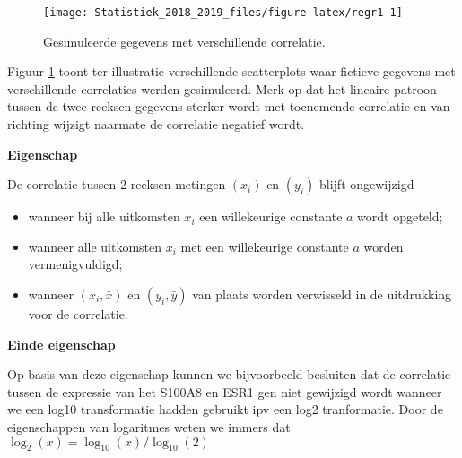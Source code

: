 \documentclass[12pt,dutch,coursenotes]{book}
\theoremstyle{definition}
\theoremstyle{definition}
\theoremstyle{definition}
\theoremstyle{remark}
\begin{document}
\begin{figure}

{\centering \texttt{[image: Statistiek\_2018\_2019\_files/figure-latex/regr1-1]} 

}

\caption{Gesimuleerde gegevens met verschillende correlatie.}\label{fig:regr1}
\end{figure}

Figuur \ref{fig:regr1} toont ter illustratie verschillende scatterplots
waar fictieve gegevens met verschillende correlaties werden gesimuleerd.
Merk op dat het lineaire patroon tussen de twee reeksen gegevens sterker
wordt met toenemende correlatie en van richting wijzigt naarmate de
correlatie negatief wordt.

\textbf{Eigenschap}

De correlatie tussen 2 reeksen metingen \((x_i)\) en \((y_i)\) blijft
ongewijzigd

\begin{itemize}
\item
  wanneer bij alle uitkomsten \(x_i\) een willekeurige constante \(a\)
  wordt opgeteld;
\item
  wanneer alle uitkomsten \(x_i\) met een willekeurige constante \(a\)
  worden vermenigvuldigd;
\item
  wanneer \((x_i,\bar x)\) en \((y_i,\bar y)\) van plaats worden
  verwisseld in de uitdrukking voor de correlatie.
\end{itemize}

\textbf{Einde eigenschap}

Op basis van deze eigenschap kunnen we bijvoorbeeld besluiten dat de
correlatie tussen de expressie van het S100A8 en ESR1 gen niet gewijzigd
wordt wanneer we een log10 transformatie hadden gebruikt ipv een log2
tranformatie. Door de eigenschappen van logaritmes weten we immers dat
\(\log_{2}(x)=\log_{10}(x)/\log_{10}(2)\)
\end{document}
